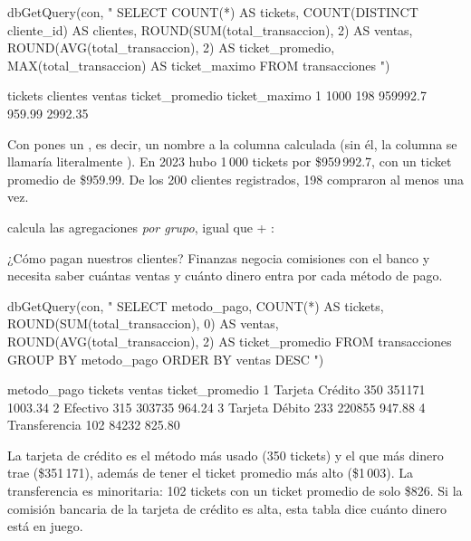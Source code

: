 \begin{rcode}
dbGetQuery(con, "
  SELECT COUNT(*)                         AS tickets,
         COUNT(DISTINCT cliente_id)       AS clientes,
         ROUND(SUM(total_transaccion), 2) AS ventas,
         ROUND(AVG(total_transaccion), 2) AS ticket_promedio,
         MAX(total_transaccion)           AS ticket_maximo
  FROM transacciones
")
\end{rcode}

\begin{rsalida}
  tickets clientes   ventas ticket_promedio ticket_maximo
1    1000      198 959992.7          959.99       2992.35
\end{rsalida}

Con  pones un , es decir, un nombre a la columna
calculada (sin él, la columna se llamaría literalmente
). En 2023 hubo 1\,000 tickets por
\$959\,992.7, con un ticket promedio de \$959.99. De los 200 clientes
registrados, 198 compraron al menos una vez.

 calcula las agregaciones \emph{por grupo}, igual que
 + :

\begin{ejemplo}{¿Cómo pagan nuestros clientes?}
Finanzas negocia comisiones con el banco y necesita saber cuántas ventas y
cuánto dinero entra por cada método de pago.
\end{ejemplo}

\begin{rcode}
dbGetQuery(con, "
  SELECT metodo_pago,
         COUNT(*)                         AS tickets,
         ROUND(SUM(total_transaccion), 0) AS ventas,
         ROUND(AVG(total_transaccion), 2) AS ticket_promedio
  FROM transacciones
  GROUP BY metodo_pago
  ORDER BY ventas DESC
")
\end{rcode}

\begin{rsalida}
      metodo_pago tickets ventas ticket_promedio
1 Tarjeta Crédito     350 351171         1003.34
2        Efectivo     315 303735          964.24
3  Tarjeta Débito     233 220855          947.88
4   Transferencia     102  84232          825.80
\end{rsalida}

La tarjeta de crédito es el método más usado (350 tickets) y el que más
dinero trae (\$351\,171), además de tener el ticket promedio más alto
(\$1\,003). La transferencia es minoritaria: 102 tickets con un ticket
promedio de solo \$826. Si la comisión bancaria de la tarjeta de crédito es
alta, esta tabla dice cuánto dinero está en juego.

